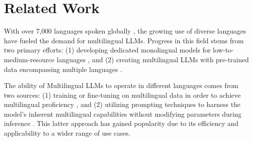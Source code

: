 \section{Related Work}

With over 7,000 languages spoken globally \citep{anderson2010many},   the growing use of diverse languages have fueled the demand for multilingual LLMs. Progress in this field stems from two primary efforts: (1) developing dedicated monolingual models for low-to-medium-resource languages \citep{seker2022alephbert, cui2023efficient, andersland2024amharic}, and (2) creating multilingual LLMs with pre-trained data encompassing multiple languages  \citep{qin2024multilingual, jiang2024mixtral}. 

The ability of Multilingual LLMs to operate in %
different languages  \citep{raffel2020exploring, conneau2019unsupervised, chowdhery2023palm} comes from two sources: (1)  training or fine-tuning on multilingual data in order to achieve multilingual proficiency
\citep{xue2020mt5, chen2021zero, le2023bloom, shaham2024multilingual, muennighoff2022crosslingual}, and (2) utilizing prompting techniques to harness the model's inherent multilingual capabilities without modifying parameters during inference \citep{brown2020language}. This latter approach has gained popularity due to its efficiency and applicability to a wider range of use cases.








